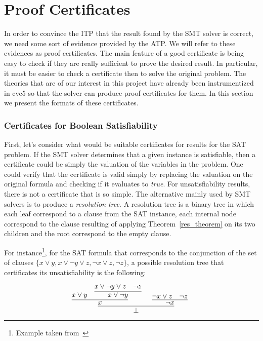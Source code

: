 \section{Proof Certificates}

In order to convince the ITP that the result found by the SMT solver is correct, we need some sort of evidence provided by the ATP.
We will refer to these evidences as proof certificates. The main feature of a good certificate is being easy to check if they are really sufficient to prove the desired result. In particular, it must be easier to check a certificate then to solve the original problem. The theories that are of our interest in this project have already been instrumentized in cvc5 so that the solver can produce proof certificates for them. In this section we present the formats of these certificates.

\subsubsection{Certificates for Boolean Satisfiability}

First, let's consider what would be suitable certificates for results for the SAT problem. If the SMT solver determines that a given instance is satisfiable, then a certificate could be simply the valuation of the variables in the problem. One could verify that the certificate is valid simply by replacing the valuation on the original formula and checking if it evaluates to \textit{true}. For unsatisfiability results, there is not a certificate that is so simple. The alternative mainly used by SMT solvers is to produce a \textit{resolution tree}. A resolution tree is a binary tree in which each leaf correspond to a clause from the SAT instance, each internal node correspond to the clause resulting of applying Theorem~\ref{res_theorem} on its two children and the root correspond to the empty clause.

For instance\footnote{Example taken from~\cite{smtcoq}}, for the SAT formula that corresponds to the conjunction of the set of clauses $\{x \vee y, x \vee \neg y \vee z, \neg x \vee z,  \neg z\}$, a possible resolution tree that certificates its unsatisfiability is the following:


\inferLineSkip=3pt
\[
\infer[]{\bot}{
  \infer[]
  {x}
  {x \vee y & \infer[]{x \vee \neg y}{x \vee \neg y \vee z & \neg z}} & \infer[]{\neg x}{\neg x \vee z & \neg z}}
\]

